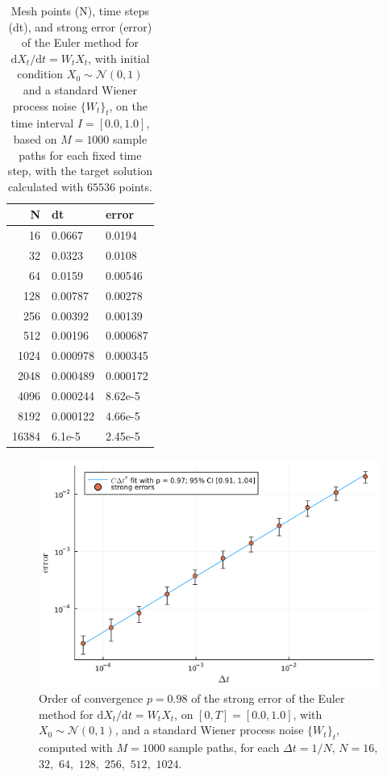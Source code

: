 \documentclass[reqno,12pt]{amsart}
\theoremstyle{plain} %
\theoremstyle{definition} %
\begin{document}
\begin{table}
    \begin{tabular}[htb]{|r|l|l|}
        \hline N & dt & error\\
        \hline \hline
        16 & 0.0667 & 0.0194 \\
        32 & 0.0323 & 0.0108 \\
        64 & 0.0159 & 0.00546 \\
        128 & 0.00787 & 0.00278 \\
        256 & 0.00392 & 0.00139 \\
        512 & 0.00196 & 0.000687 \\
        1024 & 0.000978 & 0.000345 \\
        2048 & 0.000489 & 0.000172 \\
        4096 & 0.000244 & 8.62e-5 \\
        8192 & 0.000122 & 4.66e-5 \\
        16384 & 6.1e-5 & 2.45e-5 \\
        \hline
    \end{tabular}
    \bigskip

    \caption{Mesh points (N), time steps (dt), and strong error (error) of the Euler method for $\mathrm{d}X_t/\mathrm{d}t = W_t X_t$, with initial condition $X_0 \sim \mathcal{N}(0, 1)$ and a standard Wiener process noise $\{W_t\}_t$, on the time interval $I=[0.0, 1.0]$, based on $M = 1000$ sample paths for each fixed time step, with the target solution calculated with $65536$ points.}
    \label{tablinearhomogeneousrode}
\end{table}

\begin{figure}[htb]
    \includegraphics[scale=0.4]{img/order_wiener_linearhomogenous.png}
    \caption{Order of convergence $p = 0.98$ of the strong error of the Euler method for
    $\mathrm{d}X_t/\mathrm{d}t = W_t X_t$, on $[0, T] = [0.0, 1.0]$, with $X_0 \sim \mathcal{N}(0, 1)$,
    and a standard Wiener process noise $\{W_t\}_t$,
    computed with $M = 1000$ sample paths,
    for each $\Delta t = 1/N$,  $N = 16,$ $32,$ $64,$ $128,$ $256,$ $512,$ $1024$.}
    \label{figlinearhomogeneousrode}
\end{figure}
\end{document}
